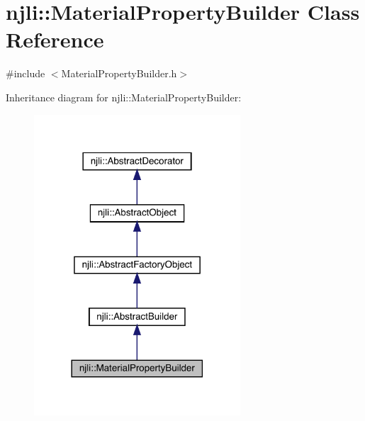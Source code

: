 \hypertarget{classnjli_1_1_material_property_builder}{}\section{njli\+:\+:Material\+Property\+Builder Class Reference}
\label{classnjli_1_1_material_property_builder}


{\ttfamily \#include $<$Material\+Property\+Builder.\+h$>$}



Inheritance diagram for njli\+:\+:Material\+Property\+Builder\+:\nopagebreak
\begin{figure}[H]
\begin{center}
\leavevmode
\includegraphics[width=218pt]{classnjli_1_1_material_property_builder__inherit__graph}
\end{center}
\end{figure}



